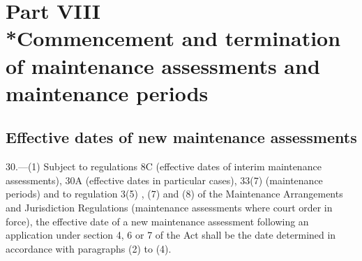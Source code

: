 \documentclass[a4paper,12pt]{article}
\begin{document}
\section[Part VIII --- Commencement and termination of maintenance assessments and maintenance periods]{\sloppy Part VIII\\*Commencement and termination of maintenance assessments and maintenance periods}

\renewcommand\parthead{--- Part VIII}

\subsection[30. Effective dates of new maintenance assessments]{Effective dates of new maintenance assessments}

30.—(1) Subject to 
regulations 8C (effective dates of interim maintenance assessments), 30A (effective dates in particular cases), 33(7) (maintenance periods)  %
and to regulation 3(5)%
, (7) and (8)  %
of the Maintenance Arrangements and Jurisdiction Regulations (maintenance assessments where court order in force),  %
 the effective date of a new maintenance assessment following an application under section 4, 6 or 7 of the Act shall be the date determined in accordance with paragraphs (2) to (4).

%
%
\end{document}
